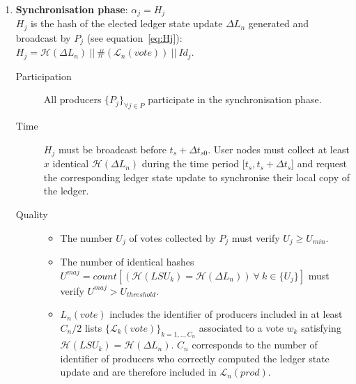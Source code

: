 \begin{enumerate}
\item \textbf{Synchronisation phase}: $\alpha_j = H_j$\\
$H_j$ is the hash of the elected ledger state update $\Delta L_n$ generated and broadcast by $P_j$ (see equation~\ref{eq:Hj}): $H_j = \mathcal{H}(\Delta L_n)~||~\#(\mathcal{L}_{n}(vote))~||~Id_j$.
\begin{description}
\item[Participation] All producers $\{P_j\}_{\forall j \in P}$ participate in the synchronisation phase. 
\item[Time] $H_j$ must be broadcast before $t_s + \Delta t_{s0}$. User nodes must collect at least $x$ identical $ \mathcal{H}(\Delta L_n)$ during the time period [$t_s, t_s + \Delta t_{s}$] and request the corresponding ledger state update to synchronise their local copy of the ledger.
\item[Quality] 
\begin{itemize}
\item The number $U_j$ of votes collected by $P_j$ must verify $U_j \geq U_{min}$.
\item The number of identical hashes $U^{maj} = count[(\mathcal{H}(LSU_k) = \mathcal{H}(\Delta L_n))~\forall~k\in\{U_j\}]$ must verify $U^{maj} > U_{threshold}$.
\item $L_n(vote)$ includes the identifier of producers included in at least $C_n/2$ lists $\{\mathcal{L}_{k}(vote)\}_{k=1,..,C_n}$ associated to a vote $w_{k}$ satisfying $\mathcal{H}(LSU_k) = \mathcal{H}(\Delta L_n)$. $C_n$ corresponds to the number of identifier of producers who correctly computed the ledger state update and are therefore included in $\mathcal{L}_{n}(prod)$.
\end{itemize}
\end{description}
\end{enumerate}

